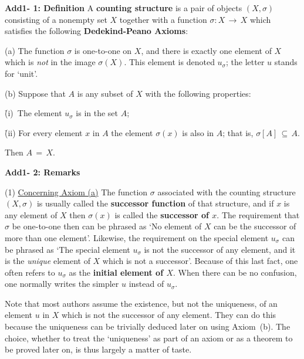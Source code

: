 {\V

        {\bf Add1- 1: Definition} A {\bf counting structure} is a pair of objects $(X,{\sigma})$ consisting of a nonempty set $X$ together with a function ${\sigma}:X \,{\rightarrow}\, X$ which satisfies the following {\bf Dedekind-Peano Axioms}:

\V

        (a) The function ${\sigma}$ is one-to-one on $X$, and there is exactly one element of $X$ which is {\em not} in the image ${\sigma}(X)$.
    This element is denoted $u_{{\sigma}}$; the letter $u$ stands for `unit'.

\V

        (b) Suppose that $A$ is any subset of $X$ with the following properties:

            \h (i)\, The element $u_{{\sigma}}$ is in the set $A$;

            \h (ii)  For every element $x$ in $A$ the element ${\sigma}(x)$ is also in $A$;
    that is, ${\sigma}[A] \,{\subseteq}\, A$.

\noindent Then $A \,=\, X$.

\V


        {\bf Add1- 2: Remarks}

        (1) \underline{Concerning Axiom (a)} The function ${\sigma}$ associated with the counting structure $(X,{\sigma})$ is usually called the {\bf successor function} of that structure,
    and if $x$ is any element of $X$ then ${\sigma}(x)$ is called the {\bf successor of $x$}.
    The requirement that ${\sigma}$ be one-to-one then can be phrased as `No  element of $X$ can be the successor of more than one element'.
    Likewise, the requirement on the special element $u_{{\sigma}}$ can be phrased as `The special element $u_{{\sigma}}$ is not the successor of any element, and it is the {\em unique} element of $X$ which is not a successor'.
    Because of this last fact, one often refers to $u_{{\sigma}}$ as the {\bf initial element of $X$}.
    When there can be no confusion, one normally writes the simpler $u$ instead of $u_{{\sigma}}$.

        Note that most authors assume the existence, but not the uniqueness, of an element $u$ in $X$ which is not the successor of any element.
    They can do this because the uniqueness can be trivially deduced later on using Axiom~(b).
    The choice, whether to treat the `uniqueness' as part of an axiom or as a theorem to be proved later on, is thus largely a matter of taste.

}
